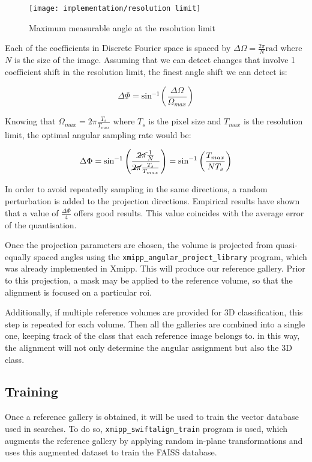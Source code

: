 \documentclass[../main.tex]{subfiles}
\begin{document}
\begin{figure}
    \centering
    \texttt{[image: implementation/resolution limit]}
    \caption{Maximum measurable angle at the resolution limit}
    \label{fig:4:resolution_limit}
\end{figure}

Each of the coefficients in Discrete Fourier space is spaced by $\Delta\Omega = \frac{2 \pi}{N} \si{\radian}$ where $N$ is the size of the image. Assuming that we can detect changes that involve 1 coefficient shift in the resolution limit, the finest angle shift we can detect is:

\begin{equation}
    \Delta\Phi = \text{sin}^{-1} \left( \frac{\Delta\Omega}{\Omega_{max}} \right)
\end{equation}

Knowing that $\Omega_{max} = 2 \pi \frac{T_s}{T_{max}}$ where $T_s$ is the pixel size and $T_{max}$ is the resolution limit, the optimal angular sampling rate would be:

\begin{equation}
    \Delta\Phi = 
    \text{sin}^{-1} \left( \frac{\cancel{2 \pi} \frac{1}{N}}{\cancel{2 \pi} \frac{T_s}{T_{max}}} \right) =
    \text{sin}^{-1} \left( \frac{T_{max}}{N T_s} \right)
\end{equation}

In order to avoid repeatedly sampling in the same directions, a random perturbation is added to the projection directions. Empirical results have shown that a value of $\frac{\Delta\Phi}{4}$ offers good results. This value coincides with the average error of the quantisation.

Once the projection parameters are chosen, the volume is projected from quasi-equally spaced angles using the \texttt{xmipp\_angular\_project\_library} program, which was already implemented in Xmipp. This will produce our reference gallery. Prior to this projection, a mask may be applied to the reference volume, so that the alignment is focused on a particular \gls{roi}. 

Additionally, if multiple reference volumes are provided for 3D classification, this step is repeated for each volume. Then all the galleries are combined into a single one, keeping track of the class that each reference image belongs to. in this way, the alignment will not only determine the angular assignment but also the 3D class.

\subsection{Training}
Once a reference gallery is obtained, it will be used to train the vector database used in searches. To do so, \texttt{xmipp\_swiftalign\_train} program is used, which augments the reference gallery by applying random in-plane transformations and uses this augmented dataset to train the FAISS database. 
\end{document}
